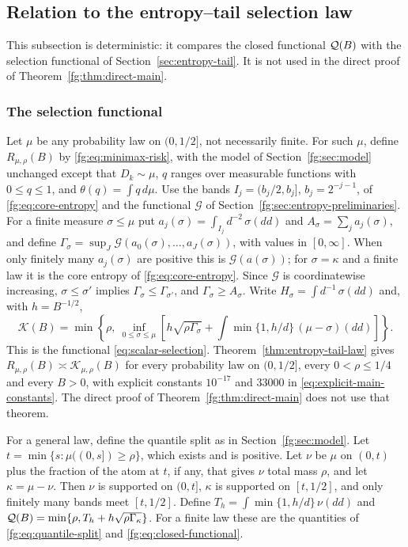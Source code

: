 \subsection{Relation to the entropy--tail selection law}\label{fg:sec:comparison}
This subsection is deterministic: it compares the closed functional
$\mathcal Q(B)$ with the selection functional of Section~\ref{sec:entropy-tail}.
It is not used in the direct proof of Theorem~\ref{fg:thm:direct-main}.

\subsubsection{The selection functional}
Let $\mu$ be any probability law on $(0,1/2]$, not necessarily finite.
For such $\mu$, define $R_{\mu,\rho}(B)$ by \eqref{fg:eq:minimax-risk},
with the model of Section~\ref{fg:sec:model} unchanged except that
$D_k\sim\mu$, $q$ ranges over measurable functions with $0\le q\le1$,
and $\theta(q)=\int q\,d\mu$. Use the bands $I_j=(b_j/2,b_j]$, $b_j=2^{-j-1}$, of
\eqref{fg:eq:core-entropy} and the functional $\mathcal G$ of
Section~\ref{fg:sec:entropy-preliminaries}. For a finite measure
$\sigma\le\mu$ put $a_j(\sigma)=\int_{I_j}d^{-2}\,\sigma(dd)$ and
$A_\sigma=\sum_ja_j(\sigma)$, and define
$\Gamma_\sigma=\sup_J\mathcal G(a_0(\sigma),\ldots,a_J(\sigma))$,
with values in $[0,\infty]$. When only finitely many $a_j(\sigma)$ are
positive this is $\mathcal G(a(\sigma))$; for $\sigma=\kappa$ and a finite
law it is the core entropy of \eqref{fg:eq:core-entropy}. Since $\mathcal G$
is coordinatewise increasing, $\sigma\le\sigma'$ implies
$\Gamma_\sigma\le\Gamma_{\sigma'}$, and $\Gamma_\sigma\ge A_\sigma$.
Write $H_\sigma=\int d^{-1}\,\sigma(dd)$ and, with $h=B^{-1/2}$,
\begin{equation}\label{fg:eq:selection-functional}
 \mathcal K(B)=\min\left\{\rho,\ \inf_{0\le\sigma\le\mu}
 \left[h\sqrt{\rho\Gamma_\sigma}
       +\int\min\{1,h/d\}\,(\mu-\sigma)(dd)\right]\right\}.
\end{equation}
This is the functional \eqref{eq:scalar-selection}.
Theorem~\ref{thm:entropy-tail-law} gives
$R_{\mu,\rho}(B)\asymp\mathcal K_{\mu,\rho}(B)$
for every probability law on $(0,1/2]$, every $0<\rho\le1/4$ and every
$B>0$, with explicit constants $10^{-17}$ and $33000$
in \eqref{eq:explicit-main-constants}. The direct proof of
Theorem~\ref{fg:thm:direct-main} does not use that theorem.

For a general law, define the quantile split as in
Section~\ref{fg:sec:model}. Let $t=\min\{s:\mu((0,s])\ge\rho\}$, which
exists and is positive. Let $\nu$ be $\mu$ on $(0,t)$ plus the fraction
of the atom at $t$, if any, that gives $\nu$ total mass $\rho$, and let
$\kappa=\mu-\nu$. Then $\nu$ is supported on $(0,t]$, $\kappa$ is
supported on $[t,1/2]$, and only finitely many bands meet $[t,1/2]$.
Define $T_h=\int\min\{1,h/d\}\,\nu(dd)$ and
$\mathcal Q(B)=\min\{\rho,T_h+h\sqrt{\rho\Gamma_\kappa}\}$. For a finite law these
are the quantities of \eqref{fg:eq:quantile-split}
and \eqref{fg:eq:closed-functional}.

